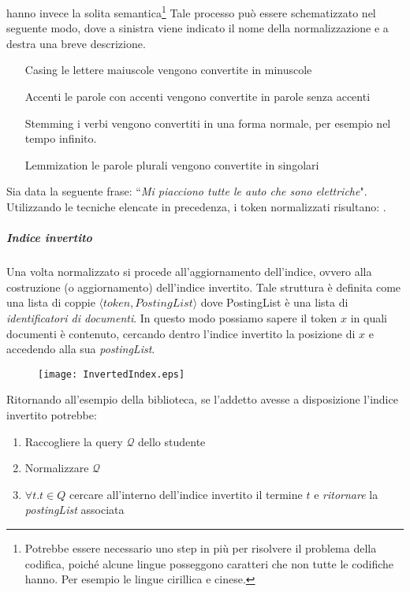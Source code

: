 hanno invece la solita semantica\footnote{Potrebbe essere necessario uno step in più per risolvere il problema della codifica, poiché alcune lingue posseggono caratteri che non tutte le codifiche hanno. Per esempio le
lingue cirillica e cinese.}
Tale processo può essere schematizzato nel seguente modo, dove a sinistra viene indicato
il nome della normalizzazione e a destra una breve descrizione.
\begin{itemize}
	\item[Casing] le lettere maiuscole vengono convertite in minuscole
	\item[Accenti] le parole con accenti vengono convertite in parole senza accenti
	\item[Stemming] i verbi vengono convertiti in una forma normale, per esempio nel tempo infinito.
	\item[Lemmization] le parole plurali vengono convertite in singolari
\end{itemize}

\begin{esempio}[normalization]
	Sia data la seguente frase: ``\textit{Mi piacciono tutte le auto che sono elettriche}".
	Utilizzando le tecniche elencate in precedenza, i token normalizzati risultano:
	    
	  .
\end{esempio}

\subparagraph{Indice invertito}
Una volta normalizzato si procede all'aggiornamento dell'indice, ovvero alla costruzione (o aggiornamento)
dell'indice invertito. Tale struttura è definita come una lista di coppie
$\langle token, PostingList \rangle$ dove PostingList è una lista di \textit{identificatori di documenti}.
In questo modo possiamo sapere il token $x$ in quali documenti è contenuto, cercando dentro l'indice
invertito la posizione di $x$ e accedendo alla sua \textit{postingList}.

\begin{figure}[h]
	\label{fig:invertedIndex}
	\centering
	\texttt{[image: InvertedIndex.eps]}
\end{figure}

Ritornando all'esempio della biblioteca, se l'addetto avesse a disposizione l'indice invertito potrebbe:
\begin{enumerate}
	\item Raccogliere la query $\mathcal{Q}$ dello studente
	\item Normalizzare $\mathcal{Q}$
	\item $\forall t.t\in Q$ cercare all'interno dell'indice invertito il termine $t$ e \textit{ritornare} la \textit{postingList} associata
\end{enumerate}

